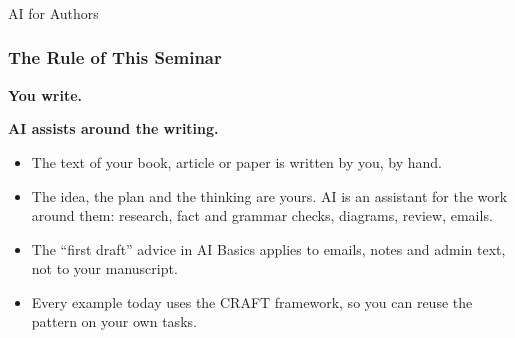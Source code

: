 
\begin{frame}[fragile]\frametitle{}
\begin{center}
{\Large AI for Authors}
\end{center}
\end{frame}


\begin{frame}[fragile]\frametitle{The Rule of This Seminar}
\begin{center}
\Large
\textbf{You write.}

\medskip
\textbf{AI assists around the writing.}
\end{center}

\medskip
\begin{itemize}
\item The text of your book, article or paper is written by you, by hand.
\item The idea, the plan and the thinking are yours. AI is an assistant for the work around them: research, fact and grammar checks, diagrams, review, emails.
\item The ``first draft'' advice in AI Basics applies to emails, notes and admin text, not to your manuscript.
\item Every example today uses the CRAFT framework, so you can reuse the pattern on your own tasks.
\end{itemize}
\end{frame}

